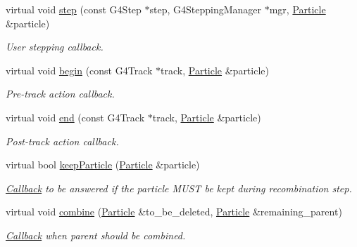 \begin{DoxyCompactItemize}
virtual void \hyperlink{class_d_d4hep_1_1_simulation_1_1_geant4_user_particle_handler_ac6a981e18ee2fa776907fda60aa54bb6}{step} (const G4\+Step $\ast$step, G4\+Stepping\+Manager $\ast$mgr, \hyperlink{class_d_d4hep_1_1_simulation_1_1_geant4_user_particle_handler_a0222f326d539ff27c6c446a7a30e8e26}{Particle} \&particle)
\begin{DoxyCompactList}\small\item\em User stepping callback. \end{DoxyCompactList}\item 
virtual void \hyperlink{class_d_d4hep_1_1_simulation_1_1_geant4_user_particle_handler_a1a26c0a3a16679a1378cfcdfbc5800e2}{begin} (const G4\+Track $\ast$track, \hyperlink{class_d_d4hep_1_1_simulation_1_1_geant4_user_particle_handler_a0222f326d539ff27c6c446a7a30e8e26}{Particle} \&particle)
\begin{DoxyCompactList}\small\item\em Pre-\/track action callback. \end{DoxyCompactList}\item 
virtual void \hyperlink{class_d_d4hep_1_1_simulation_1_1_geant4_user_particle_handler_a327d267d834a00157ebd0b1e99e1685c}{end} (const G4\+Track $\ast$track, \hyperlink{class_d_d4hep_1_1_simulation_1_1_geant4_user_particle_handler_a0222f326d539ff27c6c446a7a30e8e26}{Particle} \&particle)
\begin{DoxyCompactList}\small\item\em Post-\/track action callback. \end{DoxyCompactList}\item 
virtual bool \hyperlink{class_d_d4hep_1_1_simulation_1_1_geant4_user_particle_handler_a34cc6206492754adfea2f007313512dc}{keep\+Particle} (\hyperlink{class_d_d4hep_1_1_simulation_1_1_geant4_user_particle_handler_a0222f326d539ff27c6c446a7a30e8e26}{Particle} \&particle)
\begin{DoxyCompactList}\small\item\em \hyperlink{class_d_d4hep_1_1_callback}{Callback} to be answered if the particle M\+U\+ST be kept during recombination step. \end{DoxyCompactList}\item 
virtual void \hyperlink{class_d_d4hep_1_1_simulation_1_1_geant4_user_particle_handler_a8951aad04c7aaeb0ba39ef9e32d372cd}{combine} (\hyperlink{class_d_d4hep_1_1_simulation_1_1_geant4_user_particle_handler_a0222f326d539ff27c6c446a7a30e8e26}{Particle} \&to\+\_\+be\+\_\+deleted, \hyperlink{class_d_d4hep_1_1_simulation_1_1_geant4_user_particle_handler_a0222f326d539ff27c6c446a7a30e8e26}{Particle} \&remaining\+\_\+parent)
\begin{DoxyCompactList}\small\item\em \hyperlink{class_d_d4hep_1_1_callback}{Callback} when parent should be combined. \end{DoxyCompactList}\end{DoxyCompactItemize}

